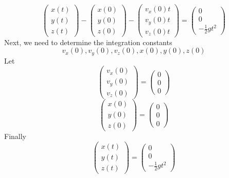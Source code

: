 $$
\left(\begin{array}{l}
{x(t)} \\
{y(t)} \\
{z(t)}
\end{array}\right)-\left(\begin{array}{l}
{x(0)} \\
{y(0)} \\
{z(0)}
\end{array}\right)-\left(\begin{array}{l}
{v_{x}(0) t} \\
{v_{y}(0) t} \\
{v_{z}(0) t}
\end{array}\right)=\left(\begin{array}{c}
{0} \\
{0} \\
{-\frac{1}{2} g t^{2}}
\end{array}\right)
$$
Next, we need to determine the integration constants
$$
v_{x}(0), v_{y}(0), v_{z}(0), x(0), y(0), z(0)
$$
Let
$$
\left(\begin{array}{l}
{v_{x}(0)} \\
{v_{y}(0)} \\
{v_{z}(0)}
\end{array}\right)=\left(\begin{array}{l}
{0} \\
{0} \\
{0}
\end{array}\right)
$$
$$
\left(\begin{array}{l}
{x(0)} \\
{y(0)} \\
{z(0)}
\end{array}\right)=\left(\begin{array}{l}
{0} \\
{0} \\
{0}
\end{array}\right)
$$
Finally
$$
\left(\begin{array}{c}
{x(t)} \\
{y(t)} \\
{z(t)}
\end{array}\right)=\left(\begin{array}{c}
{0} \\
{0} \\
{-\frac{1}{2} g t^{2}}
\end{array}\right)
$$
